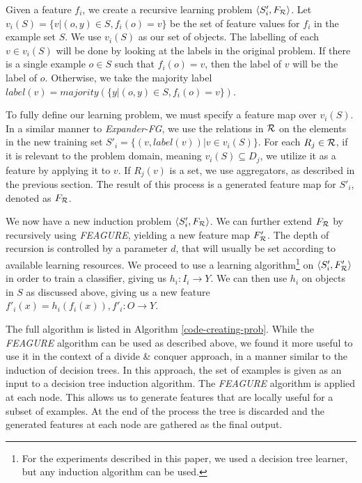 \documentclass{article}
\theoremstyle{definition}
\begin{document}
Given a feature $f_{i}$, we create a recursive learning problem $\langle S'_i,F_{\cal R} \rangle$. %
 Let $v_i(S) = \{v | (o,y) \in S, f_{i}(o)=v\}$ be the set of feature values for $f_i$ in the example set $S$. %
We use $v_i(S)$ as our set of objects. The labelling of each $v \in v_i(S)$ will be done by looking at the labels in the original problem.
 If there is a single example $o \in S$ such that $f_i(o)=v$, then the label of $v$ will be the label of $o$. Otherwise, we take the majority label  $label(v)=majority(\{y|(o,y)\in S, f_i(o)=v\})$.

To fully define our learning problem, we must specify a feature map over $v_i(S)$. In a similar manner to \emph{Expander-FG}, we use the relations in ${\cal R}$ on the elements in the new training set $S'_i = \{ (v, label(v)) | v \in v_i(S) \}$.
For each $R_j\in {\cal R}$, if it is relevant to the problem domain, meaning $v_i(S)\subseteq D_j$, we utilize it as a feature by applying it to $v$. If $R_j(v)$ is a set, we use aggregators, as described in the previous section. 
The result of this process is a generated feature map for $S'_i$, denoted as $F_{\cal R}$. 

We now have a new induction problem $\langle S'_i,F_{\cal R} \rangle$.
We can further extend $F_{\cal R}$ by recursively using \emph{FEAGURE}, yielding a new feature map $F'_{\cal R}$. The depth of recursion is controlled by a parameter $d$, that will usually be set according to available learning resources.
We proceed to use a learning algorithm\footnote{For the experiments described in this paper, we used a decision tree learner, but any induction algorithm can be used.} on $\langle S'_i,F'_{\cal R} \rangle$ in order to train a classifier, giving us $h_i:I_i\rightarrow Y$. We can then use $h_i$ on objects in $S$ as discussed above, giving us a new feature $f'_{i}(x)=h_{i}(f_{i}(x)), f'_{i}:O\rightarrow Y$. 

The full algorithm is listed in Algorithm \ref{code-creating-prob}.
While the \emph{FEAGURE} algorithm can be used as described above, we found it more useful to use it in the context of a divide \& conquer approach, in a manner similar to the induction of decision trees.
In this approach, the set of examples is given as an input to a decision tree induction algorithm. The \emph{FEAGURE} algorithm is applied at each node. 
This allows us to generate features that are locally useful for a subset of examples.
At the end of the process the tree is discarded and the generated features at each node are gathered as the final output.
\end{document}
